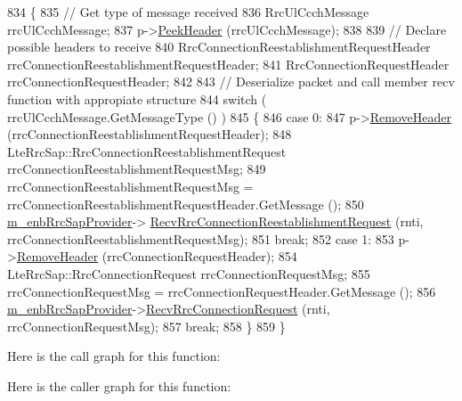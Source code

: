 \begin{DoxyCode}
834 \{
835   \textcolor{comment}{// Get type of message received}
836   RrcUlCcchMessage rrcUlCcchMessage;
837   p->\hyperlink{classns3_1_1Packet_aadc63487bea70945c418f4c3e9b81964}{PeekHeader} (rrcUlCcchMessage);
838 
839   \textcolor{comment}{// Declare possible headers to receive}
840   RrcConnectionReestablishmentRequestHeader rrcConnectionReestablishmentRequestHeader;
841   RrcConnectionRequestHeader rrcConnectionRequestHeader;
842 
843   \textcolor{comment}{// Deserialize packet and call member recv function with appropiate structure}
844   \textcolor{keywordflow}{switch} ( rrcUlCcchMessage.GetMessageType () )
845     \{
846     \textcolor{keywordflow}{case} 0:
847       p->\hyperlink{classns3_1_1Packet_a0961eccf975d75f902d40956c93ba63e}{RemoveHeader} (rrcConnectionReestablishmentRequestHeader);
848       LteRrcSap::RrcConnectionReestablishmentRequest rrcConnectionReestablishmentRequestMsg;
849       rrcConnectionReestablishmentRequestMsg = rrcConnectionReestablishmentRequestHeader.GetMessage ();
850       \hyperlink{classns3_1_1MmWaveLteEnbRrcProtocolReal_af89474441e0041b55d1e24a5bd73df15}{m\_enbRrcSapProvider}->
      \hyperlink{classns3_1_1LteEnbRrcSapProvider_a205d3d264d52fa434896589d48d8210e}{RecvRrcConnectionReestablishmentRequest} (rnti,
      rrcConnectionReestablishmentRequestMsg);
851       \textcolor{keywordflow}{break};
852     \textcolor{keywordflow}{case} 1:
853       p->\hyperlink{classns3_1_1Packet_a0961eccf975d75f902d40956c93ba63e}{RemoveHeader} (rrcConnectionRequestHeader);
854       LteRrcSap::RrcConnectionRequest rrcConnectionRequestMsg;
855       rrcConnectionRequestMsg = rrcConnectionRequestHeader.GetMessage ();
856       \hyperlink{classns3_1_1MmWaveLteEnbRrcProtocolReal_af89474441e0041b55d1e24a5bd73df15}{m\_enbRrcSapProvider}->\hyperlink{classns3_1_1LteEnbRrcSapProvider_a6a49a245760fe748a1e959e92c9cc313}{RecvRrcConnectionRequest} (rnti,
      rrcConnectionRequestMsg);
857       \textcolor{keywordflow}{break};
858     \}
859 \}
\end{DoxyCode}


Here is the call graph for this function\+:




Here is the caller graph for this function\+:


